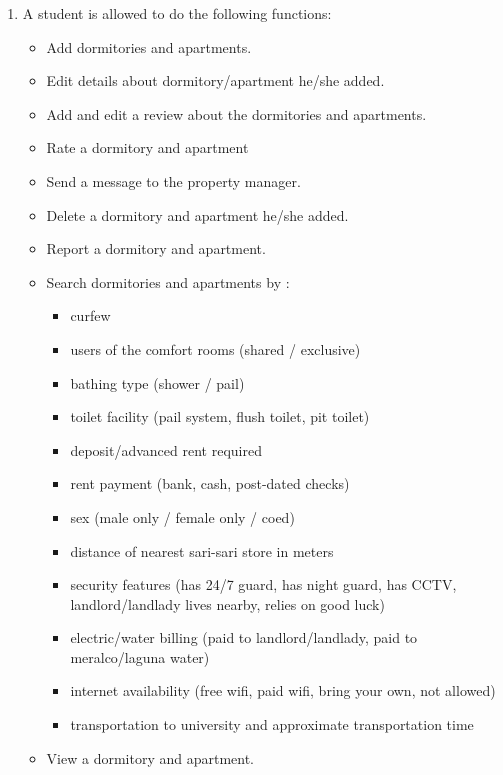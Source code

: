 \documentclass[journal]{./IEEE/IEEEtran}
\begin{document}
\begin{enumerate}
\begin{figure}
		\end{figure}
		\item A student is allowed to do the following functions:
			\begin{itemize}
				\item Add dormitories and apartments.
				\item Edit details about dormitory/apartment he/she added.
				\item Add and edit a review about the dormitories and apartments.
				\item Rate a dormitory and apartment
				\item Send a message to the property manager.
				\item Delete a dormitory and apartment he/she added.
				\item Report a dormitory and apartment.
				\item Search dormitories and apartments by :
					\begin{itemize}
						\item curfew
						\item users of the comfort rooms (shared / exclusive)
						\item bathing type (shower / pail)
						\item toilet facility (pail system, flush toilet, pit toilet) 
						\item deposit/advanced rent required
						\item rent payment (bank, cash, post-dated checks)
						\item sex (male only / female only / coed)
						\item distance of nearest sari-sari store in meters
						\item security features (has 24/7 guard, has night guard, has CCTV, landlord/landlady lives nearby, relies on good luck)
						\item electric/water billing (paid to landlord/landlady, paid to meralco/laguna water)
						\item internet availability (free wifi, paid wifi, bring your own, not allowed)
						\item transportation to university and approximate transportation time

					\end{itemize}
				\item View a dormitory and apartment.
			

\end{itemize}
\end{enumerate}
\end{document}
